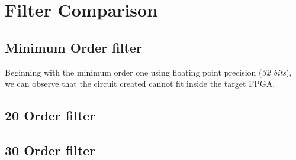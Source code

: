 
\section{Filter Comparison}

\subsection{Minimum Order filter}
Beginning with the minimum order one using floating point precision (\textit{32 bits}), we can observe that the circuit created cannot fit inside the target FPGA.

\subsection{20 Order filter}

\subsection{30 Order filter}
